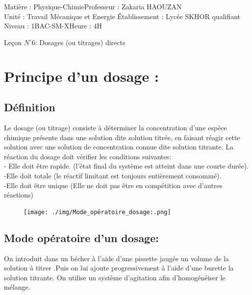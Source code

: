 \documentclass[12pt]{article}
\author{Zakaria HAOUZAN}
\date{\today}
\newcommand\headerMe[2]{\noindent{}#1\hfill#2}
\begin{document}
\headerMe{Matière : Physique-Chimie}{Professeur : Zakaria HAOUZAN}\\
\headerMe{Unité : Travail Mécanique et Energie }{Établissement : Lycée SKHOR qualifiant}\\
\headerMe{Niveau : 1BAC-SM-X}{Heure : 4H}\\

\begin{center}

    \Large{Leçon $N^{\circ} 6 $: \color{red}Dosages (ou titrages) directs }
\end{center}






\section{Principe d’un dosage : }
\subsection{Définition }
Le dosage (ou titrage) consiste à déterminer la concentration d'une espèce chimique présente dans une solution dite
solution titrée, en faisant réagir cette solution avec une solution de concentration connue dite solution titrante.
La réaction du dosage doit vérifier les conditions suivantes:
\\- Elle doit être rapide. (l'état final du système est atteint dans une courte durée).
\\-Elle doit totale (le réactif limitant est toujours entièrement consommé).
\\-Elle doit être unique (Elle ne doit pas être en compétition avec d'autres réactions)
\begin{figure}
  \vspace{-2cm}
    \texttt{[image: ./img/Mode\_opératoire\_dosage:.png]}
\end{figure}
  \subsection{Mode opératoire d'un dosage:}
On introduit dans un bécher à l'aide d'une pissette jaugée un volume de la solution à titrer .Puis on lui ajoute
progressivement à l'aide d'une burette la solution titrante. On utilise un système d'agitation afin d'homogénéiser le
mélange.
\end{document}
